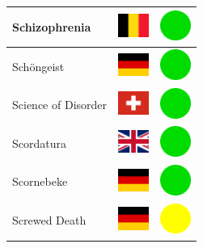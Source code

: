 \documentclass[12pt, a4paper, twoside]{report}
\begin{document}
\begin{center}
\begin{longtable}{|p{5cm}|p{2cm}|p{2cm}|}
 Schizophrenia                                              & \includegraphics[width=1cm]{../img/flags/be} &   \includegraphics[width=1cm]{../likes/y} \\ \hline
 Schöngeist                                                 & \includegraphics[width=1cm]{../img/flags/de} &   \includegraphics[width=1cm]{../likes/y} \\ \hline
 Science of Disorder                                        & \includegraphics[width=1cm]{../img/flags/ch} &   \includegraphics[width=1cm]{../likes/y} \\ \hline
 Scordatura                                                 & \includegraphics[width=1cm]{../img/flags/gb} &   \includegraphics[width=1cm]{../likes/y} \\ \hline
 Scornebeke                                                 & \includegraphics[width=1cm]{../img/flags/de} &   \includegraphics[width=1cm]{../likes/y} \\ \hline
 Screwed Death                                              & \includegraphics[width=1cm]{../img/flags/de} &   \includegraphics[width=1cm]{../likes/m} \\ \hline

\end{longtable}
\end{center}
\end{document}
